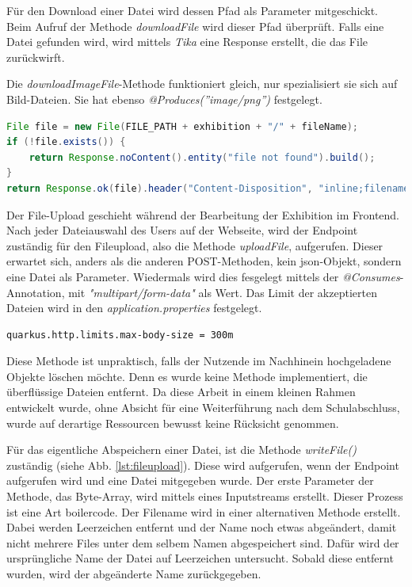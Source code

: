 Für den Download einer Datei wird dessen Pfad als Parameter mitgeschickt. 
Beim Aufruf der Methode \emph{downloadFile} wird dieser Pfad überprüft. 
Falls eine Datei gefunden wird, wird mittels \emph{Tika} eine Response erstellt, die das File zurückwirft. 

Die \emph{downloadImageFile}-Methode funktioniert gleich, nur spezialisiert sie sich auf Bild-Dateien. 
Sie hat ebenso \emph{@Produces({''image/png''})} festgelegt.

\begin{lstlisting}[label=lst:file:downloadImage, language=Java, caption=downloadImageFile-Methode]
File file = new File(FILE_PATH + exhibition + "/" + fileName);
if (!file.exists()) {
    return Response.noContent().entity("file not found").build();
}
return Response.ok(file).header("Content-Disposition", "inline;filename=" + fileName).build();
\end{lstlisting}

Der File-Upload geschieht während der Bearbeitung der Exhibition im Frontend. 
Nach jeder Dateiauswahl des Users auf der Webseite, wird der Endpoint zuständig für den Fileupload, also die Methode \emph{uploadFile}, aufgerufen. 
Dieser erwartet sich, anders als die anderen POST-Methoden, kein \gls{json}-Objekt, sondern eine Datei als Parameter. 
Wiedermals wird dies fesgelegt mittels der \emph{@Consumes}-Annotation, mit \emph{"multipart/form-data"} als Wert. 
Das Limit der akzeptierten Dateien wird in den \emph{application.properties} festgelegt. 
\begin{lstlisting}[label=lst:filesizemax]
quarkus.http.limits.max-body-size = 300m
\end{lstlisting}

Diese Methode ist unpraktisch, falls der Nutzende im Nachhinein hochgeladene Objekte löschen möchte. 
Denn es wurde keine Methode implementiert, die überflüssige Dateien entfernt. 
Da diese Arbeit in einem kleinen Rahmen entwickelt wurde, ohne Absicht für eine Weiterführung nach dem Schulabschluss, wurde auf derartige Ressourcen bewusst keine Rücksicht genommen.

Für das eigentliche Abspeichern einer Datei, ist die Methode \emph{writeFile()} zuständig (siehe Abb. \ref{lst:fileupload}). 
Diese wird aufgerufen, wenn der Endpoint aufgerufen wird und eine Datei mitgegeben wurde. 
Der erste Parameter der Methode, das Byte-Array, wird mittels eines Inputstreams erstellt. 
Dieser Prozess ist eine Art \gls{boilercode}.
Der Filename wird in einer alternativen Methode erstellt. 
Dabei werden Leerzeichen entfernt und der Name noch etwas abgeändert, damit nicht mehrere Files unter dem selbem Namen abgespeichert sind. 
Dafür wird der ursprüngliche Name der Datei auf Leerzeichen untersucht.
Sobald diese entfernt wurden, wird der abgeänderte Name zurückgegeben. 

